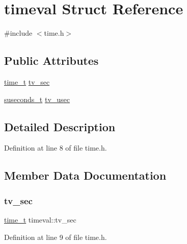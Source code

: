 \hypertarget{structtimeval}{}\section{timeval Struct Reference}
\label{structtimeval}


{\ttfamily \#include $<$time.\+h$>$}

\subsection*{Public Attributes}
\begin{DoxyCompactItemize}
\item 
\mbox{\hyperlink{time_8h_aec517130c026730881898750d76e596f}{time\+\_\+t}} \mbox{\hyperlink{structtimeval_aef6ddab1064c430758f9f913b7e4a21e}{tv\+\_\+sec}}
\item 
\mbox{\hyperlink{sys_2time_8h_a909167c659c8a090775b22285c2b8519}{suseconds\+\_\+t}} \mbox{\hyperlink{structtimeval_a810bf8fcd58e255a5c1896d19538b86a}{tv\+\_\+usec}}
\end{DoxyCompactItemize}


\subsection{Detailed Description}


Definition at line 8 of file time.\+h.



\subsection{Member Data Documentation}
\mbox{\label{structtimeval_aef6ddab1064c430758f9f913b7e4a21e}} 
\subsubsection{\texorpdfstring{tv\_sec}{tv\_sec}}
{\footnotesize\ttfamily \mbox{\hyperlink{time_8h_aec517130c026730881898750d76e596f}{time\+\_\+t}} timeval\+::tv\+\_\+sec}



Definition at line 9 of file time.\+h.

\mbox{\label{structtimeval_a810bf8fcd58e255a5c1896d19538b86a}} 
